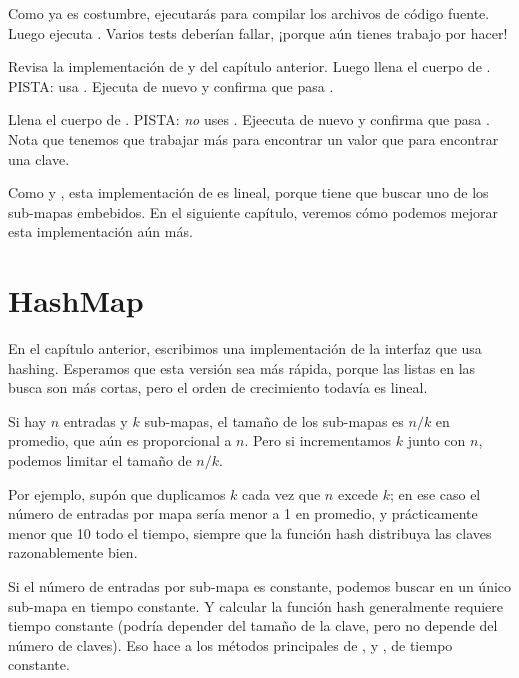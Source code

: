 \documentclass[12pt]{book}
\theoremstyle{exercise}
\begin{document}
Como ya es costumbre, ejecutarás  para compilar los archivos
de código fuente. Luego ejecuta . Varios tests deberían
fallar, ¡porque aún tienes trabajo por hacer!


Revisa la implementación de  y  del capítulo
anterior. Luego llena el cuerpo de . PISTA:
usa . Ejecuta  de nuevo y
confirma que pasa .


Llena el cuerpo de . PISTA: \emph{no} uses
.  Ejeecuta  de nuevo y confirma
que pasa . Nota que tenemos que trabajar más
para encontrar un valor que para encontrar una clave.

Como  y , esta implementación de
 es lineal, porque tiene que buscar uno de los
sub-mapas embebidos. En el siguiente capítulo, veremos cómo podemos
mejorar esta implementación aún más.



\chapter{HashMap}

En el capítulo anterior, escribimos una implementación de la
interfaz  que usa hashing.  Esperamos que esta versión
sea más rápida, porque las listas en las busca son más cortas, pero
el orden de crecimiento todavía es lineal.


Si hay $n$ entradas y $k$ sub-mapas, el tamaño de los sub-mapas es
$n/k$ en promedio, que aún es proporcional a $n$.  Pero si
incrementamos $k$ junto con $n$, podemos limitar el tamaño de $n/k$.

Por ejemplo, supón que duplicamos $k$ cada vez que
$n$ excede $k$; en ese caso el número de entradas por
mapa sería menor a 1 en promedio, y prácticamente menor
que 10 todo el tiempo, siempre que la función hash distribuya
las claves razonablemente bien.


Si el número de entradas por sub-mapa es constante, podemos buscar en un
único sub-mapa en tiempo constante. Y calcular la función hash generalmente
requiere tiempo constante (podría depender del tamaño de la clave, pero no
depende del número de claves). Eso hace a los métodos principales de
, y , de tiempo constante.
\end{document}
